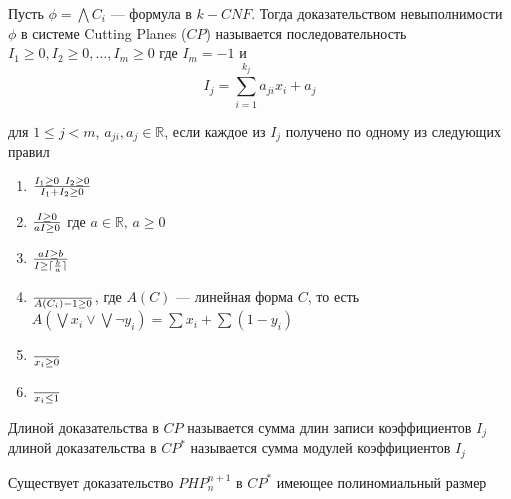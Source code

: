 

\begin{definition}
Пусть $\phi = \bigwedge C_i$ --- формула в $k-CNF$. Тогда доказательством 
невыполнимости $\phi$ в системе Cutting Planes ($CP$) называется последовательность 
$I_1 \ge 0, I_2 \ge 0, \ldots, I_m \ge 0$
где $I_m = -1$ и
$$I_j = \sum\limits_{i=1}^{k_j} a_{ji} x_i + a_j$$

для $1 \le j < m$, $a_{ji}, a_j \in \mathbb{R}$, если каждое из $I_j$ получено
 по одному из следующих правил

\begin{enumerate}
\item ${I_1 \ge 0 \,\,\, I_2 \ge 0 \over I_1 + I_2 \ge 0}$
\item ${I \ge 0 \over aI \ge 0}$ где $a \in \mathbb{R},\, a \ge 0$
\item ${aI \ge b \over I \ge \lceil {b \over a} \rceil}$
\item ${ \over A(C_i) - 1 \ge 0}$, где $A(C)$ --- линейная форма $C$, то есть 
$A(\bigvee x_i \lor \bigvee \lnot y_i) = \sum x_i + \sum (1-y_i)$
\item ${\over x_i \ge 0}$
\item ${\over x_i \le 1}$
\end{enumerate}

Длиной доказательства в $CP$ называется сумма длин записи коэффициентов $I_j$ длиной
доказательства в $CP^*$ называется сумма модулей коэффициентов $I_j$
\end{definition}
\begin{theorem}
 Существует доказательство $PHP_{n}^{n+1}$ в $CP^*$ имеющее полиномиальный размер
\end{theorem}
